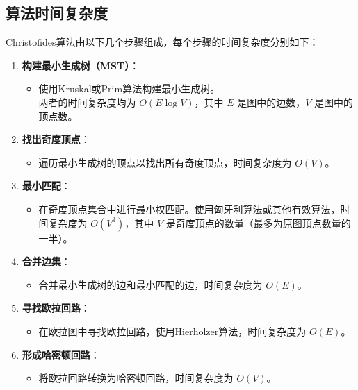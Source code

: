 \documentclass{report}
\begin{document}
\subsection{算法时间复杂度}

Christofides算法由以下几个步骤组成，每个步骤的时间复杂度分别如下：

\begin{enumerate}
    \item \textbf{构建最小生成树（MST）}：
    \begin{itemize}
        \item 使用Kruskal或Prim算法构建最小生成树。\\
        两者的时间复杂度均为 $O(E \log V)$，其中 $E$ 是图中的边数，$V$ 是图中的顶点数。
    \end{itemize}

    \item \textbf{找出奇度顶点}：
    \begin{itemize}
        \item 遍历最小生成树的顶点以找出所有奇度顶点，时间复杂度为 $O(V)$。
    \end{itemize}

    \item \textbf{最小匹配}：
    \begin{itemize}
        \item 在奇度顶点集合中进行最小权匹配。使用匈牙利算法或其他有效算法，时间复杂度为 $O(V^3)$，其中 $V$ 是奇度顶点的数量（最多为原图顶点数量的一半）。
    \end{itemize}

    \item \textbf{合并边集}：
    \begin{itemize}
        \item 合并最小生成树的边和最小匹配的边，时间复杂度为 $O(E)$。
    \end{itemize}

    \item \textbf{寻找欧拉回路}：
    \begin{itemize}
        \item 在欧拉图中寻找欧拉回路，使用Hierholzer算法，时间复杂度为 $O(E)$。
    \end{itemize}

    \item \textbf{形成哈密顿回路}：
    \begin{itemize}
        \item 将欧拉回路转换为哈密顿回路，时间复杂度为 $O(V)$。
    \end{itemize}
\end{enumerate}
\end{document}

